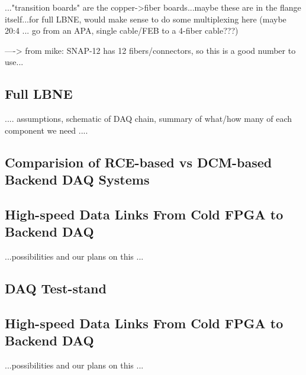 ..."transition boards" are the copper->fiber boards...maybe these are in the flange itself...for full LBNE, would make sense to do some multiplexing here (maybe 20:4 ... go from an APA, single cable/FEB to a 4-fiber cable???)

----> from mike:  SNAP-12 has 12 fibers/connectors, so this is a good number to use...


\subsection{Full LBNE}

....  assumptions, schematic of DAQ chain, summary of what/how many of each component we need  ....  



\subsection{Comparision of RCE-based vs DCM-based Backend DAQ Systems}



\subsection{High-speed Data Links From Cold FPGA to Backend DAQ}

...possibilities and our plans on this ...


\subsection{DAQ Test-stand}




\subsection{High-speed Data Links From Cold FPGA to Backend DAQ}

...possibilities and our plans on this ...